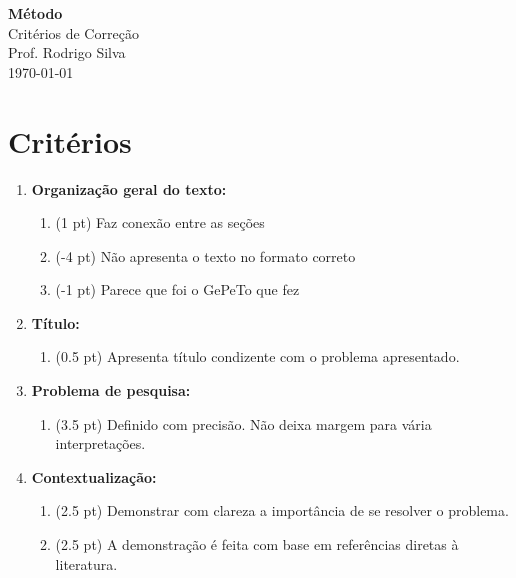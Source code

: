 \documentclass[12pt,a4paper, brazil]{article}
\begin{document}
\begin{center}
{\textbf {\huge Método}}\\[5mm]
{\large Critérios de Correção } \\[2mm]
{\large Prof. Rodrigo Silva } \\[5mm]
\today\\[5mm] %
\end{center}



\section*{Critérios}

\begin{enumerate}
    \item \textbf{Organização geral do texto:}
        \begin{enumerate}
            \item (1 pt) Faz conexão entre as seções
            \item (-4 pt) Não apresenta o texto no formato correto
            \item (-1 pt) Parece que foi o GePeTo que fez
        \end{enumerate}
    \item \textbf{Título:} 
    \begin{enumerate}
        \item (0.5 pt) Apresenta título condizente com o problema apresentado.
    \end{enumerate}
    \item \textbf{Problema de pesquisa:} 
        \begin{enumerate}
            \item (3.5 pt) Definido com precisão. Não deixa margem para vária interpretações.
        \end{enumerate}
    \item \textbf{Contextualização:} 
        \begin{enumerate}
            \item (2.5 pt) Demonstrar com clareza a importância de se resolver o problema.
            \item (2.5 pt) A demonstração é feita com base em referências diretas à literatura. 
        \end{enumerate}
\end{enumerate}
\end{document}
